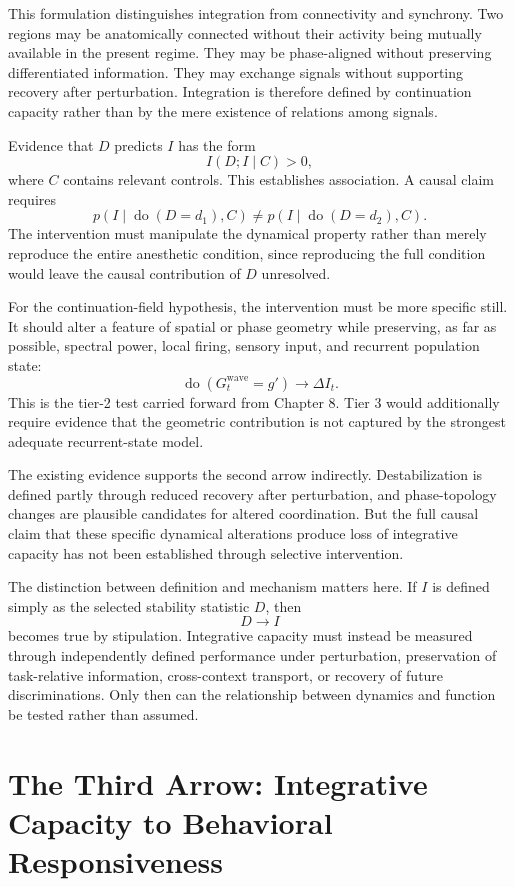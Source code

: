 \documentclass[11pt]{book}
\begin{document}
This formulation distinguishes integration from connectivity and synchrony. Two regions may be anatomically connected without their activity being mutually available in the present regime. They may be phase-aligned without preserving differentiated information. They may exchange signals without supporting recovery after perturbation. Integration is therefore defined by continuation capacity rather than by the mere existence of relations among signals.

Evidence that $D$ predicts $I$ has the form
\[
I(D;I\mid C)>0,
\]
where $C$ contains relevant controls. This establishes association. A causal claim requires
\[
p\!\left(
I\mid\operatorname{do}(D=d_1),C
\right)
\neq
p\!\left(
I\mid\operatorname{do}(D=d_2),C
\right).
\]
The intervention must manipulate the dynamical property rather than merely reproduce the entire anesthetic condition, since reproducing the full condition would leave the causal contribution of $D$ unresolved.

For the continuation-field hypothesis, the intervention must be more specific still. It should alter a feature of spatial or phase geometry while preserving, as far as possible, spectral power, local firing, sensory input, and recurrent population state:
\[
\operatorname{do}
\left(
G_t^{\mathrm{wave}}=g'
\right)
\longrightarrow
\Delta I_t.
\]
This is the tier-2 test carried forward from Chapter 8. Tier 3 would additionally require evidence that the geometric contribution is not captured by the strongest adequate recurrent-state model.

The existing evidence supports the second arrow indirectly. Destabilization is defined partly through reduced recovery after perturbation, and phase-topology changes are plausible candidates for altered coordination. But the full causal claim that these specific dynamical alterations produce loss of integrative capacity has not been established through selective intervention.

The distinction between definition and mechanism matters here. If $I$ is defined simply as the selected stability statistic $D$, then
\[
D\longrightarrow I
\]
becomes true by stipulation. Integrative capacity must instead be measured through independently defined performance under perturbation, preservation of task-relative information, cross-context transport, or recovery of future discriminations. Only then can the relationship between dynamics and function be tested rather than assumed.

\section*{The Third Arrow: Integrative Capacity to Behavioral Responsiveness}
\end{document}
